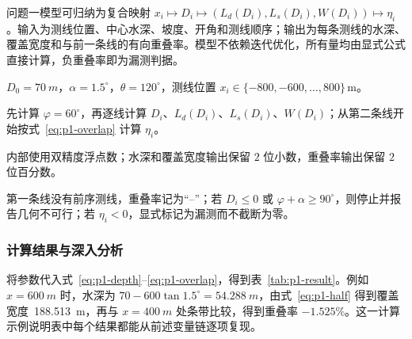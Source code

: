 \begin{modelsummary}[问题一模型归纳]
问题一模型可归纳为复合映射 $x_i\mapsto D_i\mapsto(L_d(D_i),L_s(D_i),W(D_i))\mapsto\eta_i$。输入为测线位置、中心水深、坡度、开角和测线顺序；输出为每条测线的水深、覆盖宽度和与前一条线的有向重叠率。模型不依赖迭代优化，所有量均由显式公式直接计算，负重叠率即为漏测判据。
\end{modelsummary}

\begin{solvercontract}[问题一算法求解说明]
\item[输入] $D_0=\SI{70}{m}$，$\alpha=1.5^\circ$，$\theta=120^\circ$，测线位置 $x_i\in\{-800,-600,\ldots,800\}\,\mathrm{m}$。
\item[计算顺序] 先计算 $\varphi=60^\circ$，再逐线计算 $D_i$、$L_d(D_i)$、$L_s(D_i)$、$W(D_i)$；从第二条线开始按式~\eqref{eq:p1-overlap} 计算 $\eta_i$。
\item[精度] 内部使用双精度浮点数；水深和覆盖宽度输出保留 $2$ 位小数，重叠率输出保留 $2$ 位百分数。
\item[特殊情况] 第一条线没有前序测线，重叠率记为“--”；若 $D_i\le0$ 或 $\varphi+\alpha\ge90^\circ$，则停止并报告几何不可行；若 $\eta_i<0$，显式标记为漏测而不截断为零。
\end{solvercontract}

\subsubsection{计算结果与深入分析}
将参数代入式~\eqref{eq:p1-depth}--\eqref{eq:p1-overlap}，得到表~\ref{tab:p1-result}。例如 $x=\SI{600}{m}$ 时，水深为 $70-600\tan1.5^\circ=\SI{54.288}{m}$，由式~\eqref{eq:p1-half} 得到覆盖宽度 \,\SI{188.513}{m}，再与 $x=\SI{400}{m}$ 处条带比较，得到重叠率 $-1.525\%$。这一计算示例说明表中每个结果都能从前述变量链逐项复现。

\begin{table}[H]
\centering
\caption{问题一计算结果}
\label{tab:p1-result}
\end{table}

